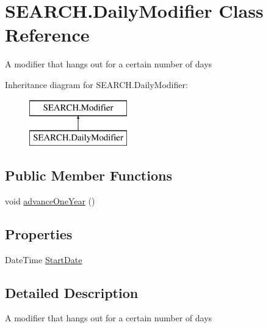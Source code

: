 \hypertarget{class_s_e_a_r_c_h_1_1_daily_modifier}{\section{S\-E\-A\-R\-C\-H.\-Daily\-Modifier Class Reference}
\label{class_s_e_a_r_c_h_1_1_daily_modifier}
}


A modifier that hangs out for a certain number of days  


Inheritance diagram for S\-E\-A\-R\-C\-H.\-Daily\-Modifier\-:\begin{figure}[H]
\begin{center}
\leavevmode
\includegraphics[height=2.000000cm]{class_s_e_a_r_c_h_1_1_daily_modifier}
\end{center}
\end{figure}
\subsection*{Public Member Functions}
\begin{DoxyCompactItemize}
\item 
void \hyperlink{class_s_e_a_r_c_h_1_1_daily_modifier_a92b4972ae3d4cc4f4557d859e1de1942}{advance\-One\-Year} ()
\end{DoxyCompactItemize}
\subsection*{Properties}
\begin{DoxyCompactItemize}
\item 
Date\-Time \hyperlink{class_s_e_a_r_c_h_1_1_daily_modifier_a4b8518a5ae505e906256c155ce090122}{Start\-Date}
\end{DoxyCompactItemize}


\subsection{Detailed Description}
A modifier that hangs out for a certain number of days 




